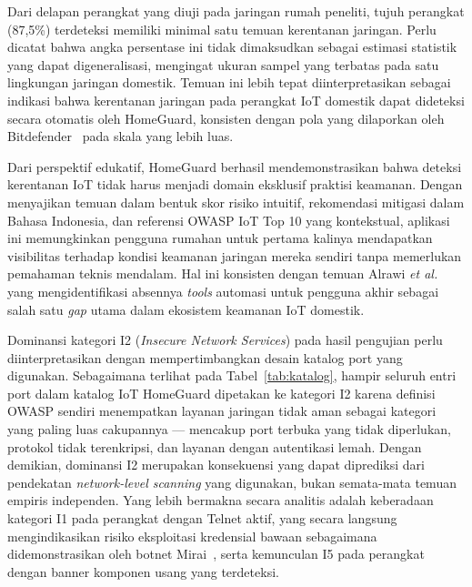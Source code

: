 Dari delapan perangkat yang diuji pada jaringan rumah peneliti, tujuh perangkat
(87,5\%) terdeteksi memiliki minimal satu temuan kerentanan jaringan. Perlu
dicatat bahwa angka persentase ini tidak dimaksudkan sebagai estimasi statistik
yang dapat digeneralisasi, mengingat ukuran sampel yang terbatas pada satu
lingkungan jaringan domestik. Temuan ini lebih tepat diinterpretasikan sebagai
indikasi bahwa kerentanan jaringan pada perangkat IoT domestik dapat dideteksi
secara otomatis oleh HomeGuard, konsisten dengan pola yang dilaporkan oleh
Bitdefender~\cite{b3} pada skala yang lebih luas.

Dari perspektif edukatif, HomeGuard berhasil mendemonstrasikan bahwa deteksi
kerentanan IoT tidak harus menjadi domain eksklusif praktisi keamanan. Dengan
menyajikan temuan dalam bentuk skor risiko intuitif, rekomendasi mitigasi dalam
Bahasa Indonesia, dan referensi OWASP IoT Top 10 yang kontekstual, aplikasi ini
memungkinkan pengguna rumahan untuk pertama kalinya mendapatkan visibilitas
terhadap kondisi keamanan jaringan mereka sendiri tanpa memerlukan pemahaman
teknis mendalam. Hal ini konsisten dengan temuan Alrawi
\textit{et al.}~\cite{b2} yang mengidentifikasi absennya \textit{tools} automasi
untuk pengguna akhir sebagai salah satu \textit{gap} utama dalam ekosistem
keamanan IoT domestik.

Dominansi kategori I2 (\textit{Insecure Network Services}) pada hasil pengujian
perlu diinterpretasikan dengan mempertimbangkan desain katalog port yang
digunakan. Sebagaimana terlihat pada Tabel~\ref{tab:katalog}, hampir seluruh
entri port dalam katalog IoT HomeGuard dipetakan ke kategori I2 karena definisi
OWASP sendiri menempatkan layanan jaringan tidak aman sebagai kategori yang
paling luas cakupannya --- mencakup port terbuka yang tidak diperlukan,
protokol tidak terenkripsi, dan layanan dengan autentikasi lemah. Dengan
demikian, dominansi I2 merupakan konsekuensi yang dapat diprediksi dari
pendekatan \textit{network-level scanning} yang digunakan, bukan semata-mata
temuan empiris independen. Yang lebih bermakna secara analitis adalah
keberadaan kategori I1 pada perangkat dengan Telnet aktif, yang secara langsung
mengindikasikan risiko eksploitasi kredensial bawaan sebagaimana didemonstrasikan
oleh botnet Mirai~\cite{b1}, serta kemunculan I5 pada perangkat dengan banner
komponen usang yang terdeteksi.

